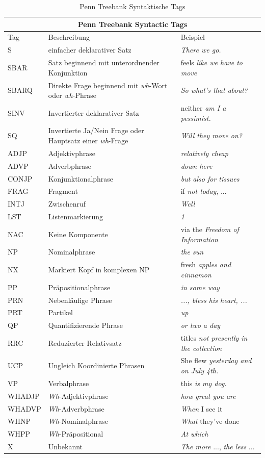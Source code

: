 \begin{table}
\begin{tabular}{ | l p{7cm} p{4cm} |}
	\hline
	\multicolumn{3}{|c|}{Penn Treebank Syntactic Tags} \\
	\hline
	\hline
	Tag & Beschreibung & Beispiel \\
	\hline
	S & einfacher deklarativer Satz & \textit{There we go.} \\
	SBAR & Satz beginnend mit unterordnender Konjunktion & feels \textit{like we have to move} \\
	SBARQ & Direkte Frage beginnend mit \textit{wh}-Wort oder \textit{wh}-Phrase & \textit{So what's that about?} \\
	SINV & Invertierter deklarativer Satz & neither \textit{am I a pessimist.} \\
	SQ & Invertierte Ja/Nein Frage oder Hauptsatz einer \textit{wh}-Frage & \textit{Will they move on?} \\
	
	ADJP & Adjektivphrase & \textit{relatively cheap} \\
	ADVP & Adverbphrase & \textit{down here} \\
	CONJP & Konjunktionalphrase &  \textit{but also for tissues}\\
	FRAG & Fragment & if \textit{not today}, ... \\
	INTJ & Zwischenruf &  \textit{Well} \\
	LST & Listenmarkierung & \textit{1} \\
	NAC & Keine Komponente & via the \textit{Freedom of Information} \\
	NP & Nominalphrase & \textit{the sun} \\
	NX & Markiert Kopf in komplexen NP & fresh \textit{apples and cinnamon} \\
	PP & Präpositionalphrase & \textit{in some way} \\
	PRN & Nebenläufige Phrase & \textit{..., bless his heart, ...} \\
	PRT & Partikel & \textit{up} \\
	QP & Quantifizierende Phrase & \textit{or two a day} \\
	RRC & Reduzierter Relativsatz & titles \textit{not presently in the collection} \\
	UCP & Ungleich Koordinierte Phrasen & She flew \textit{yesterday and on July 4th.} \\
	VP & Verbalphrase & this \textit{is my dog.} \\
	WHADJP	& \textit{Wh}-Adjektivphrase & \textit{how great you are} \\
	WHADVP & \textit{Wh}-Adverbphrase & \textit{When} I see it\\
	WHNP & \textit{Wh}-Nominalphrase & \textit{What} they've done \\
	WHPP & \textit{Wh}-Präpositional & \textit{At which} \\
	X & Unbekannt & \textit{The more} ..., \textit{the less} ... \\	
	
	\hline
\end{tabular}
\caption{Penn Treebank Syntaktische Tags} %
\label{tab:phrase-tags}
\end{table}

